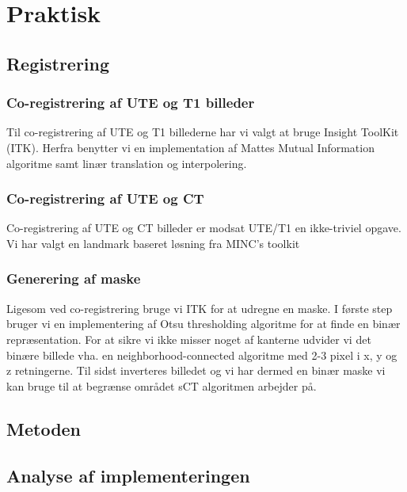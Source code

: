 \section{Praktisk}

\subsection{Registrering}


\subsubsection{Co-registrering af UTE og T1 billeder}

Til co-registrering af UTE og T1 billederne har vi valgt at bruge Insight
ToolKit (ITK). Herfra benytter vi en implementation af Mattes Mutual
Information algoritme samt linær translation og interpolering.

\subsubsection{Co-registrering af UTE og CT}

Co-registrering af UTE og CT billeder er modsat UTE/T1 en ikke-triviel
opgave. Vi har valgt en landmark baseret løsning fra MINC's toolkit

\subsubsection{Generering af maske}

Ligesom ved co-registrering bruge vi ITK for at udregne en maske. I første step
bruger vi en implementering af Otsu thresholding algoritme for at finde en binær
repræsentation. For at sikre vi ikke misser noget af kanterne udvider vi det 
binære billede vha. en neighborhood-connected algoritme med 2-3 pixel i x, y og z
retningerne. Til sidst inverteres billedet og vi har dermed en binær maske vi kan
bruge til at begrænse området sCT algoritmen arbejder på.

\subsection{Metoden}


\subsection{Analyse af implementeringen}

